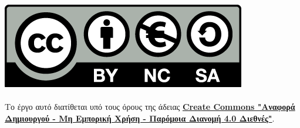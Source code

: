 \vspace*{\fill}

\begin{center}
    \href{https://creativecommons.org/licenses/by-nc-sa/4.0/deed.el}{\includegraphics[scale=0.2]{Images/cc.png}} \\
    \Rule \\[0.4cm]
    Το έργο αυτό διατίθεται υπό τους όρους της άδειας \textbf{\href{https://creativecommons.org/licenses/by-nc-sa/4.0/deed.el}{Create Commons "Αναφορά Δημιουργού - Μη Εμπορική Χρήση - Παρόμοια Διανομή 4.0 Διεθνές"}}. \\ 
\end{center}

\newpage
